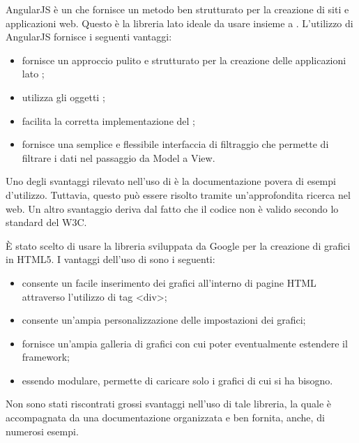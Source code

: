 AngularJS è un    che fornisce un metodo ben strutturato per la creazione di siti e applicazioni web. Questo  è la libreria lato  ideale da usare insieme a .
L'utilizzo di AngularJS fornisce i seguenti vantaggi:
\begin{itemize}
\item fornisce un approccio pulito e strutturato per la creazione delle applicazioni lato ;
\item utilizza gli oggetti ;
\item facilita la corretta implementazione del  ;
\item fornisce una semplice e flessibile interfaccia di filtraggio che permette di filtrare i dati nel passaggio da Model a View.
\end{itemize}
Uno degli svantaggi rilevato nell'uso di  è la documentazione povera di esempi d'utilizzo. Tuttavia, questo può essere risolto tramite un'approfondita ricerca nel web. Un altro svantaggio deriva dal fatto che il codice non è valido secondo lo standard del W3C. 

È stato scelto di usare la libreria  sviluppata da Google per la creazione di grafici in HTML5.
I vantaggi dell'uso di  sono i seguenti:
\begin{itemize}
\item consente un facile inserimento dei grafici all'interno di pagine HTML attraverso l'utilizzo di tag <div>;
\item consente un'ampia personalizzazione delle impostazioni dei grafici;
\item fornisce un'ampia galleria di grafici con cui poter eventualmente estendere il framework;
\item essendo modulare, permette di caricare solo i grafici di cui si ha bisogno.
\end{itemize}
Non sono stati riscontrati grossi svantaggi nell'uso di tale libreria, la quale è accompagnata da una documentazione organizzata e ben fornita, anche, di numerosi esempi.

